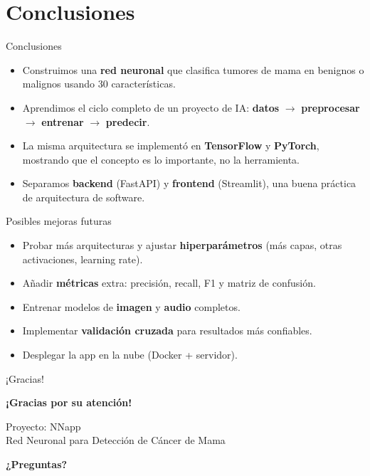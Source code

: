 \documentclass[10pt,aspectratio=169]{beamer}
\begin{document}
\section{Conclusiones}

\begin{frame}{Conclusiones}
  \begin{itemize}
    \item Construimos una \textbf{red neuronal} que clasifica tumores de mama
          en benignos o malignos usando 30 características.
    \item Aprendimos el ciclo completo de un proyecto de IA:
          \textbf{datos} $\rightarrow$ \textbf{preprocesar} $\rightarrow$
          \textbf{entrenar} $\rightarrow$ \textbf{predecir}.
    \item La misma arquitectura se implementó en \textbf{TensorFlow} y
          \textbf{PyTorch}, mostrando que el concepto es lo importante,
          no la herramienta.
    \item Separamos \textbf{backend} (FastAPI) y \textbf{frontend} (Streamlit),
          una buena práctica de arquitectura de software.
  \end{itemize}
\end{frame}

\begin{frame}{Posibles mejoras futuras}
  \begin{itemize}
    \item Probar más arquitecturas y ajustar \textbf{hiperparámetros}
          (más capas, otras activaciones, learning rate).
    \item Añadir \textbf{métricas} extra: precisión, recall, F1 y matriz de confusión.
    \item Entrenar modelos de \textbf{imagen} y \textbf{audio} completos.
    \item Implementar \textbf{validación cruzada} para resultados más confiables.
    \item Desplegar la app en la nube (Docker + servidor).
  \end{itemize}
\end{frame}

\begin{frame}{¡Gracias!}
  \begin{center}
    {\Large \textbf{¡Gracias por su atención!}}

    \vspace{0.5cm}

    {\large Proyecto: NNapp\\}
    {\large Red Neuronal para Detección de Cáncer de Mama}

    \vspace{0.5cm}

    \textbf{¿Preguntas?}
  \end{center}
\end{frame}
\end{document}
